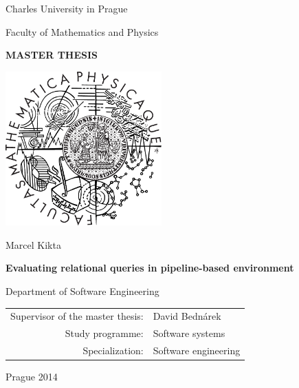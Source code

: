 \documentclass[12pt,a4paper]{report}
\begin{document}


\pagestyle{empty}
\begin{center}

\large

Charles University in Prague

\medskip

Faculty of Mathematics and Physics

\vfill

{\bf\Large MASTER THESIS}

\vfill

\centerline{\mbox{\includegraphics[width=60mm]{img/logo.pdf}}}

\vfill
\vspace{5mm}

{\LARGE Marcel Kikta}

\vspace{15mm}

{\LARGE\bfseries Evaluating relational queries in pipeline-based environment}

\vfill

Department of Software Engineering

\vfill

\begin{tabular}{rl}

Supervisor of the master thesis: & David Bednárek \\
\noalign{\vspace{2mm}}
Study programme: & Software systems \\
\noalign{\vspace{2mm}}
Specialization: & Software engineering \\
\end{tabular}

\vfill

Prague 2014

\end{center}
\end{document}
